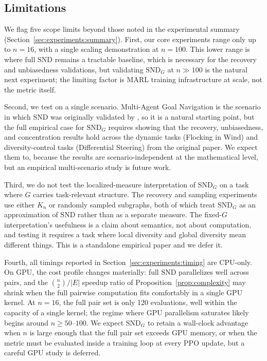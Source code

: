\documentclass[11pt]{article}
\theoremstyle{plain}
\theoremstyle{definition}
\theoremstyle{remark}
\newcommand{\SND}{\ensuremath{\mathrm{SND}}}
\newcommand{\SNDG}{\mathrm{SND}_{G}}
\begin{document}
\subsection*{Limitations}

We flag five scope limits beyond those noted in the experimental summary (Section~\ref{sec:experiments:summary}). First, our core experiments range only up to $n = 16$, with a single scaling demonstration at $n=100$. This lower range is where full $\SND$ remains a tractable baseline, which is necessary for the recovery and unbiasedness validations, but validating $\SNDG$ at $n \gg 100$ is the natural next experiment; the limiting factor is MARL training infrastructure at scale, not the metric itself.

Second, we test on a single scenario. Multi-Agent Goal Navigation is
the scenario in which $\SND$ was originally validated by
\citet{bettini2025snd}, so it is a natural starting point, but the
full empirical case for $\SNDG$ requires showing that the recovery,
unbiasedness, and concentration results hold across the dynamic tasks
(Flocking in Wind) and diversity-control tasks (Differential
Steering) from the original paper. We expect them to, because the
results are scenario-independent at the mathematical level, but an
empirical multi-scenario study is future work.

Third, we do not test the localized-measure interpretation of
$\SNDG$ on a task where $G$ carries task-relevant structure. The
recovery and sampling experiments use either $K_n$ or randomly
sampled subgraphs, both of which treat $\SNDG$ as an approximation of
$\SND$ rather than as a separate measure. The fixed-$G$
interpretation's usefulness is a claim about semantics, not about
computation, and testing it requires a task where local diversity and
global diversity mean different things. This is a standalone
empirical paper and we defer it.

Fourth, all timings reported in Section~\ref{sec:experiments:timing}
are CPU-only. On GPU, the cost profile changes materially: full
$\SND$ parallelizes well across pairs, and the $\binom{n}{2}/|E|$
speedup ratio of Proposition~\ref{prop:complexity} may shrink when
the full pairwise computation fits comfortably in a single GPU kernel. At $n = 16$, the full pair set is only 120 evaluations, well within the capacity of a single kernel; the regime where GPU parallelism saturates likely begins around $n \geq 50$--$100$. We expect $\SNDG$ to retain a wall-clock advantage when $n$
is large enough that the full pair set exceeds GPU memory, or when
the metric must be evaluated inside a training loop at every PPO
update, but a careful GPU study is deferred.
\end{document}
